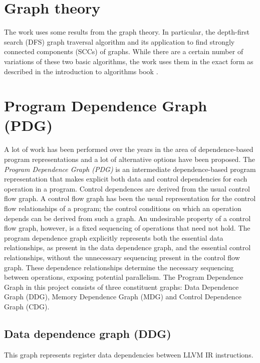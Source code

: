 \section{Graph theory} \label{background-graph-theory}
\qquad The work uses some results from the graph theory. In particular, the depth-first search (DFS) graph traversal algorithm and its application to find strongly connected components (SCCs) of graphs. While there are a certain number of variations of these two basic algorithms, the work uses them in the exact form as described in the introduction to algorithms book \cite{introduction-to-algorithms-book}.

\section{Program Dependence Graph (PDG)} \label{background-program-dependence-graph}
\qquad A lot of work has been performed over the years in the area of dependence-based program representations and a lot of alternative options have been proposed.\newline 
\null\qquad The \textit{Program Dependence Graph (PDG)} is an intermediate dependence-based program representation that makes explicit both data and control dependencies for each operation in a program.\newline 
\null\qquad Control dependences are derived from the usual control flow graph. A control flow graph has been the usual representation for the control flow relationships of a program; the control conditions on which an operation depends can be derived from such a graph. An undesirable property of a control flow graph, however, is a fixed sequencing of operations that need not hold. The program dependence graph explicitly represents both the essential data relationships, as present in the data dependence graph, and the essential control relationships, without the unnecessary sequencing present in the control flow graph. These dependence relationships determine the necessary sequencing between operations, exposing potential parallelism.\newline
\null\qquad The Program Dependence Graph in this project consists of three constituent graphs: Data Dependence Graph (DDG), Memory Dependence Graph (MDG) and Control Dependence Graph (CDG).  

\subsection{Data dependence graph (DDG)} 
\label{background-ddg}
\qquad This graph represents register data dependencies between LLVM IR instructions.  

